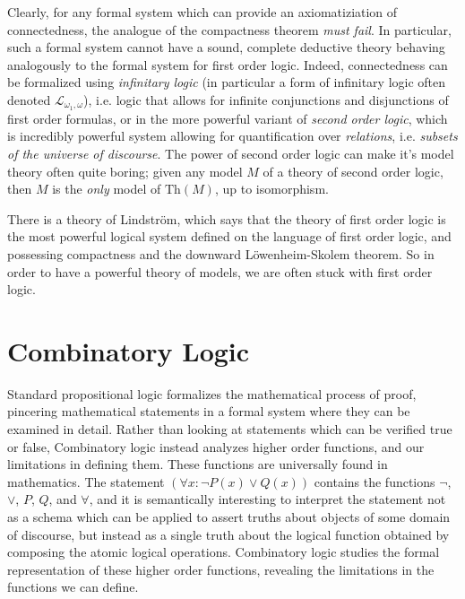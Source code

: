 Clearly, for any formal system which can provide an axiomatiziation of connectedness, the analogue of the compactness theorem \emph{must fail}. In particular, such a formal system cannot have a sound, complete deductive theory behaving analogously to the formal system for first order logic. Indeed, connectedness can be formalized using \emph{infinitary logic} (in particular a form of infinitary logic often denoted $\mathcal{L}_{\omega_1,\omega}$), i.e. logic that allows for infinite conjunctions and disjunctions of first order formulas, or in the more powerful variant of \emph{second order logic}, which is incredibly powerful system allowing for quantification over \emph{relations}, i.e. \emph{subsets of the universe of discourse}. The power of second order logic can make it's model theory often quite boring; given any model $M$ of a theory of second order logic, then $M$ is the \emph{only} model of $\text{Th}(M)$, up to isomorphism.

There is a theory of Lindstr\"{o}m, which says that the theory of first order logic is the most powerful logical system defined on the language of first order logic, and possessing compactness and the downward L\"{o}wenheim-Skolem theorem. So in order to have a powerful theory of models, we are often stuck with first order logic.







\chapter{Combinatory Logic}

Standard propositional logic formalizes the mathematical process of proof, pincering mathematical statements in a formal system where they can be examined in detail. Rather than looking at statements which can be verified true or false, Combinatory logic instead analyzes higher order functions, and our limitations in defining them. These functions are universally found in mathematics. The statement $(\forall x: \neg P(x) \vee Q(x))$ contains the functions $\neg$, $\vee$, $P$, $Q$, and $\forall$, and it is semantically interesting to interpret the statement not as a schema which can be applied to assert truths about objects of some domain of discourse, but instead as a single truth about the logical function obtained by composing the atomic logical operations. Combinatory logic studies the formal representation of these higher order functions, revealing the limitations in the functions we can define.

